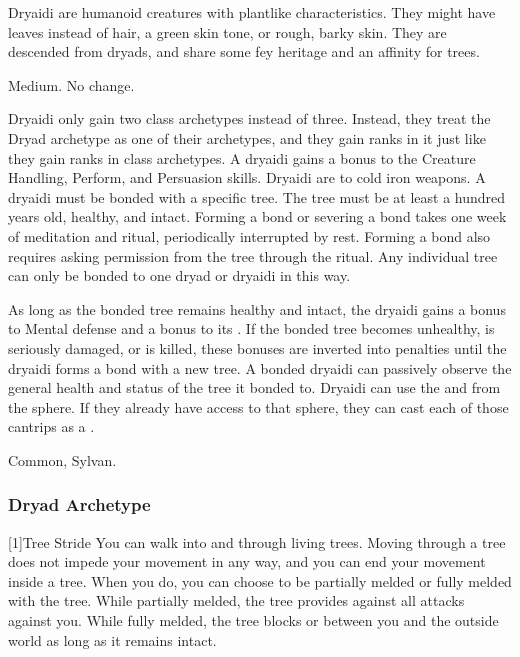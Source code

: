         Dryaidi are humanoid creatures with plantlike characteristics.
        They might have leaves instead of hair, a green skin tone, or rough, barky skin.
        They are descended from dryads, and share some fey heritage and an affinity for trees.

         Medium.
         No change.
        \begin{itemize}
             Dryaidi only gain two class archetypes instead of three.
                Instead, they treat the Dryad archetype as one of their archetypes, and they gain ranks in it just like they gain ranks in class archetypes.
             A dryaidi gains a  bonus to the Creature Handling, Perform, and Persuasion skills.
             Dryaidi are \vulnerable to cold iron weapons.
             A dryaidi must be bonded with a specific tree.
            The tree must be at least a hundred years old, healthy, and intact.
            Forming a bond or severing a bond takes one week of meditation and ritual, periodically interrupted by rest.
            Forming a bond also requires asking permission from the tree through the ritual.
            Any individual tree can only be bonded to one dryad or dryaidi in this way.

            As long as the bonded tree remains healthy and intact, the dryaidi gains a  bonus to Mental defense and a  bonus to its .
            If the bonded tree becomes unhealthy, is seriously damaged, or is killed, these bonuses are inverted into penalties until the dryaidi forms a bond with a new tree.
            A bonded dryaidi can passively observe the general health and status of the tree it bonded to.
             Dryaidi can use the  and   from the  sphere.
            If they already have access to that sphere, they can cast each of those cantrips as a .
        \end{itemize}
         Common, Sylvan.

        \subsubsection{Dryad Archetype}

            [1]{Tree Stride} You can walk into and through living trees.
            Moving through a tree does not impede your movement in any way, and you can end your movement inside a tree.
            When you do, you can choose to be partially melded or fully melded with the tree.
            While partially melded, the tree provides  against all attacks against you.
            While fully melded, the tree blocks  or  between you and the outside world as long as it remains intact.

